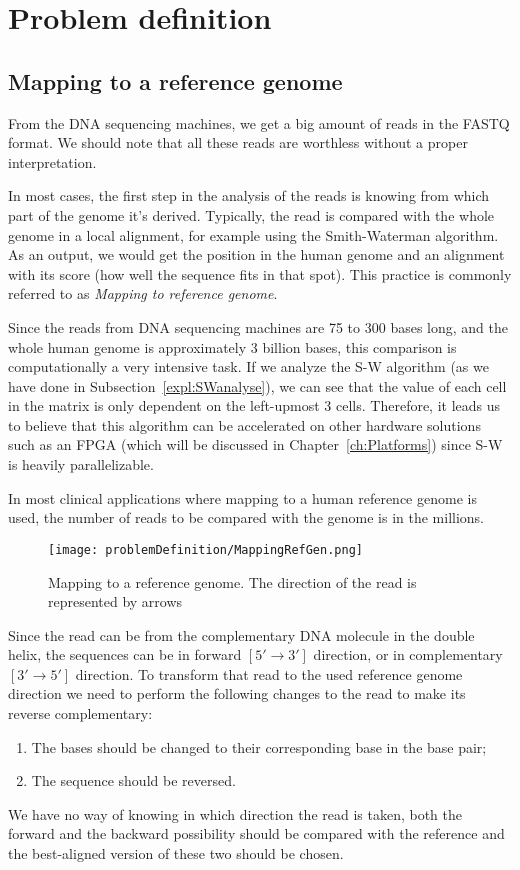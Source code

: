 \section{Problem definition}

\subsection{Mapping to a reference genome}

From the DNA sequencing machines, we get a big amount of reads in the FASTQ format. We should note that all these reads are worthless without a proper interpretation.

In most cases, the first step in the analysis of the reads is knowing from which part of the genome it's derived. Typically, the read is compared with the whole genome in a local alignment, for example using the Smith-Waterman algorithm. As an output, we would get the position in the human genome and an alignment with its score (how well the sequence fits in that spot). This practice is commonly referred to as \emph{Mapping to reference genome}.

Since the reads from DNA sequencing machines are 75 to 300 bases long, and the whole human genome is approximately 3 billion bases, this comparison is computationally a very intensive task. If we analyze the S-W algorithm (as we have done in Subsection~\ref{expl:SWanalyse}), we can see that the value of each cell in the matrix is only dependent on the left-upmost 3 cells. Therefore, it leads us to believe that this algorithm can be accelerated on other hardware solutions such as an FPGA (which will be discussed in Chapter~\ref{ch:Platforms}) since S-W is heavily parallelizable.

In most clinical applications where mapping to a human reference genome is used, the number of reads to be compared with the genome is in the millions.

\begin{figure}[H]
	\centering
	\texttt{[image: problemDefinition/MappingRefGen.png]}
	\caption{Mapping to a reference genome. The direction of the read is represented by arrows}
	\label{fig:mapRefGen}
\end{figure}

Since the read can be from the complementary DNA molecule in the double helix, the sequences can be in forward $[5' \rightarrow 3']$ direction, or in complementary $[3' \rightarrow 5']$ direction. To transform that read to the used reference genome direction we need to perform the following changes to the read to make its reverse complementary:
\begin{enumerate}
	\item The bases should be changed to their corresponding base in the base pair;
	\item The sequence should be reversed.
\end{enumerate}
We have no way of knowing in which direction the read is taken, both the forward and the backward possibility should be compared with the reference and the best-aligned version of these two should be chosen.

